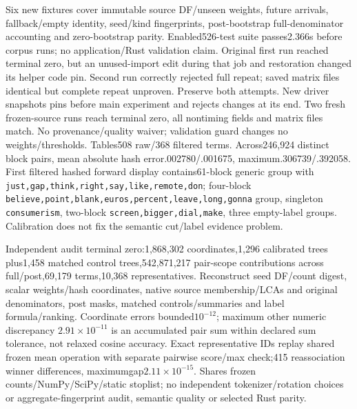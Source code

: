 \documentclass[11pt]{article}
\begin{document}
Six new fixtures cover immutable source DF/unseen weights, future arrivals,
fallback/empty identity, seed/kind fingerprints, post-bootstrap full-denominator
accounting and zero-bootstrap parity. Enabled526-test suite passes2.366s before
corpus runs; no application/Rust validation claim. Original
first run reached terminal zero, but an unused-import edit during that job and
restoration changed its helper code pin. Second run correctly rejected full
repeat; saved matrix files identical but complete repeat unproven. Preserve both
attempts. New driver snapshots pins before main experiment and rejects changes
at its end. Two fresh frozen-source runs reach terminal zero, all nontiming
fields and matrix files match. No provenance/quality waiver; validation guard
changes no weights/thresholds. Tables508 raw/368 filtered terms. Across246,924
distinct block pairs, mean absolute hash error.002780/.001675, maximum.306739/.392058.
First filtered hashed forward display contains61-block generic group with
\texttt{just,gap,think,right,say,like,remote,don}; four-block
\texttt{believe,point,blank,euros,percent,leave,long,gonna} group, singleton
\texttt{consumerism}, two-block \texttt{screen,bigger,dial,make}, three empty-label
groups. Calibration does not fix the semantic cut/label evidence problem.

Independent audit terminal zero:1,868,302 coordinates,1,296 calibrated trees
plus1,458 matched control trees,542,871,217 pair-scope contributions across
full/post,69,179 terms,10,368 representatives. Reconstruct seed DF/count digest,
scalar weights/hash coordinates, native source membership/LCAs and original
denominators, post masks, matched controls/summaries and label formula/ranking.
Coordinate errors bounded$10^{-12}$; maximum other numeric discrepancy
$2.91\times10^{-11}$ is an accumulated pair sum within declared sum tolerance,
not relaxed cosine accuracy. Exact representative IDs replay shared frozen mean
operation with separate pairwise score/max check;415 reassociation winner
differences, maximumgap$2.11\times10^{-15}$. Shares frozen counts/NumPy/SciPy/static
stoplist; no independent tokenizer/rotation choices or aggregate-fingerprint
audit, semantic quality or selected Rust parity.
\end{document}
